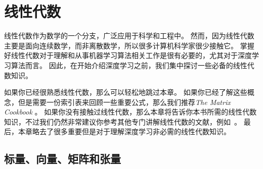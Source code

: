 \chapter{线性代数}
\label{chap:linear_algebra}

线性代数作为数学的一个分支，广泛应用于科学和工程中。
然而，因为线性代数主要是面向连续数学，而非离散数学，所以很多计算机科学家很少接触它。
掌握好线性代数对于理解和从事机器学习算法相关工作是很有必要的，尤其对于深度学习算法而言。
因此，在开始介绍深度学习之前，我们集中探讨一些必备的线性代数知识。


如果你已经很熟悉线性代数，那么可以轻松地跳过本章。
如果你已经了解这些概念，但是需要一份索引表来回顾一些重要公式，那么我们推荐\emph{The Matrix Cookbook} \citep{matrix-cookbook}。
如果你没有接触过线性代数，那么本章将告诉你本书所需的线性代数知识，不过我们仍然非常建议你参考其他专门讲解线性代数的文献，例如~\cite{shilov1977linear}。
最后，本章略去了很多重要但是对于理解深度学习非必需的线性代数知识。




\section{标量、向量、矩阵和张量}
\label{sec:scalars_vectors_matrices_and_tensors}

